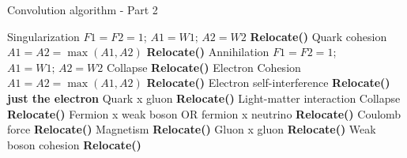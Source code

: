 \documentclass[12pt,english]{article}
\begin{document}
\begin{algorithm}
    \caption{Convolution algorithm - Part 2}
    \label{algo:convolution2}
    \small
    \begin{algorithmic}[1]
            \STATE Singularization
            \STATE $F1=F2=1$; $A1=W1;\,A2=W2$
            \STATE \textbf{Relocate()}
                \STATE Quark cohesion
                \STATE $A1=A2=\max(A1, A2)$
                \STATE \textbf{Relocate()}
                \STATE Annihilation
                \STATE $F1=F2=1$; $A1=W1;\,A2=W2$
                \STATE Collapse
                \STATE \textbf{Relocate()}
                    \STATE Electron Cohesion
                    \STATE $A1=A2=\max(A1, A2)$
                    \STATE \textbf{Relocate()}
                    \STATE Electron self-interference
                    \STATE \textbf{Relocate() just the electron}
                \ENDIF    
            \ENDIF   
                \STATE Quark x gluon
                \STATE \textbf{Relocate()}
                    \STATE Light-matter interaction
                    \STATE Collapse
                    \STATE \textbf{Relocate()}
                    \STATE Fermion x weak boson OR fermion x neutrino
                    \STATE \textbf{Relocate()}
                \ENDIF        
                \STATE Coulomb force
                \STATE \textbf{Relocate()}
                \STATE Magnetism
                \STATE \textbf{Relocate()}
            \ENDIF   
                \STATE Gluon x gluon
                \STATE \textbf{Relocate()}
                \STATE Weak boson cohesion
                \STATE \textbf{Relocate()}
            \ENDIF   
        \ENDIF   
    \end{algorithmic}
\end{algorithm}
\end{document}
